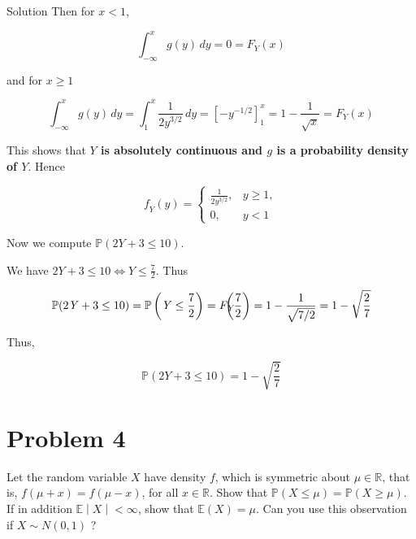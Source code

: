 \begin{qlsolution}{Solution}
Then for \(\mathit{x} < 1\),

\[\int_{- \infty}^{\mathit{x}}\mathit{g}(\mathit{y})\,\mathit{d}\mathit{y} = 0 = \mathit{F}_{\mathit{Y}}(\mathit{x})\]

and for \(\mathit{x} \geq 1\)

\[\int_{- \infty}^{\mathit{x}}\mathit{g}(\mathit{y})\,\mathit{d}\mathit{y} = \int_{1}^{\mathit{x}}\frac{1}{2\mathit{y}^{3/2}}\,\mathit{d}\mathit{y} = \left\lbrack {- \mathit{y}^{- 1/2}} \right\rbrack_{1}^{\mathit{x}} = 1 - \frac{1}{\sqrt{\mathit{x}}} = \mathit{F}_{\mathit{Y}}(\mathit{x})\]

This shows that \textbf{\(\mathit{Y}\) is absolutely continuous and \(\mathit{g}\) is a probability density of \(\mathit{Y}\)}. Hence

\[\mathit{f}_{\mathit{Y}}(\mathit{y}) = \left\{ \begin{matrix}
{\frac{1}{2\mathit{y}^{3/2}},} & {\mathit{y} \geq 1,} \\
{0,} & {\mathit{y} < 1}
\end{matrix} \right.\]

Now we compute \(\mathbb{P}(2\mathit{Y} + 3 \leq 10)\).

We have \(2\mathit{Y} + 3 \leq 10\Leftrightarrow\mathit{Y} \leq \frac{7}{2}\). Thus

\[\mathbb{P}(2\mathit{Y} + 3 \leq 10) = \mathbb{P}\left( {\mathit{Y} \leq \frac{7}{2}} \right) = \mathit{F}_{\mathit{Y}}\mspace{-18mu}\left( \frac{7}{2} \right) = 1 - \frac{1}{\sqrt{7/2}} = 1 - \sqrt{\frac{2}{7}}\]

Thus,

\[\mathbb{P}(2\mathit{Y} + 3 \leq 10) = 1 - \sqrt{\frac{2}{7}}\]

\end{qlsolution}

\section{Problem 4}\label{hw02-problem-4}

Let the random variable \(\mathit{X}\) have density \(\mathit{f}\), which is symmetric about \(\mathit{\mu} \in \mathbb{R}\), that is, \(\mathit{f}(\mathit{\mu} + \mathit{x}) = \mathit{f}(\mathit{\mu} - \mathit{x})\), for all \(\mathit{x} \in \mathbb{R}\). Show that \(\mathbb{P}(\mathit{X} \leq \mathit{\mu}) = \mathbb{P}(\mathit{X} \geq \mathit{\mu})\). If in addition \(\left. \mathbb{E} \middle| \mathit{X} \middle| < \infty \right.\), show that \(\mathbb{E}(\mathit{X}) = \mathit{\mu}\). Can you use this observation if \(\mathit{X} \sim \mathit{N}(0,1)\) ?

